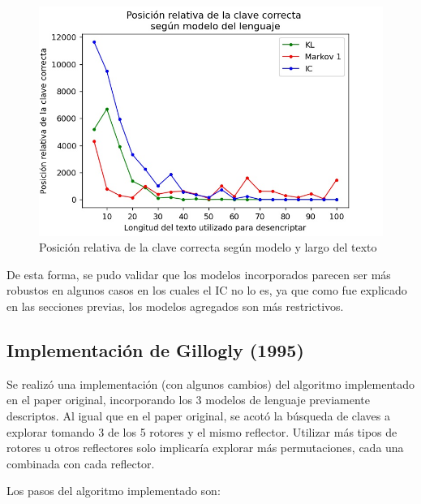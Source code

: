 \documentclass[a4paper,10pt]{article}
\begin{document}
\begin{figure}[H]
    \centering
    \includegraphics[scale=0.8]{language_model_length.jpg}
    \caption{Posición relativa de la clave correcta según modelo y largo del texto}
    \label{fig:my_label}
\end{figure}

De esta forma, se pudo validar que los modelos incorporados parecen ser más robustos en algunos casos en los cuales el IC no lo es, ya que como fue explicado en las secciones previas, los modelos agregados son más restrictivos.

\subsection{Implementación de Gillogly (1995)\cite{gillogly}}

Se realizó una implementación (con algunos cambios) del algoritmo implementado en el paper original, incorporando los 3 modelos de lenguaje previamente descriptos. Al igual que en el paper original, se acotó la búsqueda de claves a explorar tomando 3 de los 5 rotores y el mismo reflector. Utilizar más tipos de rotores u otros reflectores solo implicaría explorar más permutaciones, cada una combinada con cada reflector.

Los pasos del algoritmo implementado son:
\end{document}
